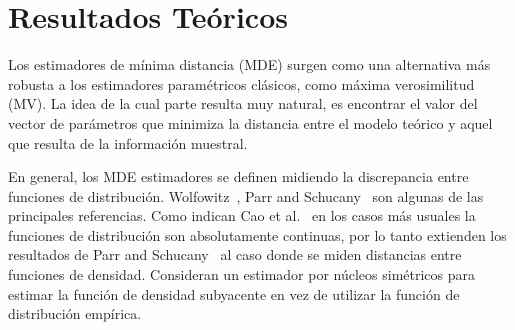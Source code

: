 
\chapter{Resultados Teóricos}
\label{ResultadosTeoricos}

Los estimadores de mínima distancia (MDE) surgen como una alternativa más robusta a los estimadores paramétricos clásicos, como máxima verosimilitud (MV). La idea de la cual parte resulta muy natural, es encontrar el valor del vector de parámetros que minimiza la distancia entre el modelo teórico y aquel que resulta de la información muestral.

%

En general, los MDE estimadores se definen midiendo la discrepancia entre funciones de distribución. Wolfowitz~\cite{Wolfowitz1954}, Parr and Schucany~\cite{Parr1980} son algunas de las principales referencias. Como indican Cao et al.~\cite{cao1995minimum} en los casos más usuales la funciones de distribución son absolutamente continuas, por lo tanto extienden los resultados de Parr and Schucany~\cite{parr1982} al caso donde se miden distancias entre funciones de densidad. Consideran un estimador por núcleos simétricos para estimar la función de densidad subyacente en vez de utilizar la función de distribución empírica.

